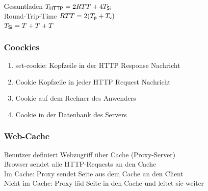 \documentclass[fs, footer]{latex4ei}
\begin{document}
\begin{multicols*}{4}
{	Gesamtladen $T_{\sf HTTP} = 2 RTT + 4 T_{\sf Si}$\\
	Round-Trip-Time $RTT = 2(T_{\sf p} + T_{\sf v})$\\
	$T_{\sf Si} = T + T +T $\\

	\subsubsection{Coockies}
	\begin{enumerate}
		\item set-cookie: Kopfzeile in der HTTP Response Nachricht\\
		\item Cookie Kopfzeile in jeder HTTP Request Nachricht\\
		\item Cookie auf dem Rechner des Anwenders\\
		\item Cookie in der Datenbank des Servers\\
	\end{enumerate}


	\subsubsection	{Web-Cache}
	Benutzer definiert Webzugriff über Cache (Proxy-Server)\\
	Browser sendet alle HTTP-Requests an den Cache\\
	Im Cache: Proxy sendet Seite aus dem Cache an den Client\\
	Nicht im Cache: Proxy läd Seite in den Cache und leitet sie weiter\\
}
\end{multicols*}
\end{document}
